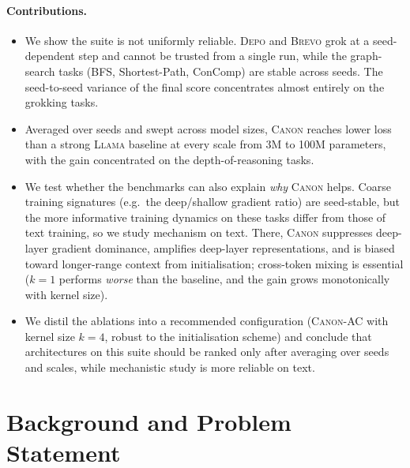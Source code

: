 \documentclass[11pt]{article}
\newcommand{\Canon}{\textsc{Canon}\xspace}
\newcommand{\Llama}{\textsc{Llama}\xspace}
\newcommand{\Depo}{\textsc{Depo}\xspace}
\newcommand{\Brevo}{\textsc{Brevo}\xspace}
\begin{document}
\paragraph{Contributions.}
\begin{itemize}
  \item We show the suite is not uniformly reliable. \Depo and \Brevo grok at a
        seed-dependent step and cannot be trusted from a single run, while the
        graph-search tasks (BFS, Shortest-Path, ConComp) are stable across seeds. The
        seed-to-seed variance of the final score concentrates almost entirely on the
        grokking tasks.
  \item Averaged over seeds and swept across model sizes, \Canon reaches lower loss than a
        strong \Llama baseline at every scale from 3M to 100M parameters, with the gain
        concentrated on the depth-of-reasoning tasks.
  \item We test whether the benchmarks can also explain \emph{why} \Canon helps. Coarse
        training signatures (e.g.\ the deep/shallow gradient ratio) are seed-stable, but the
        more informative training dynamics on these tasks differ from those of text training,
        so we study mechanism on text. There, \Canon suppresses deep-layer gradient
        dominance, amplifies deep-layer representations, and is biased toward longer-range
        context from initialisation; cross-token mixing is essential ($k{=}1$ performs
        \emph{worse} than the baseline, and the gain grows monotonically with kernel size).
  \item We distil the ablations into a recommended configuration (\Canon-AC with
        kernel size $k{=}4$, robust to the initialisation scheme) and conclude that
        architectures on this suite should be ranked only after averaging over seeds and
        scales, while mechanistic study is more reliable on text.
\end{itemize}

\section{Background and Problem Statement}
\label{sec:background}
\end{document}
